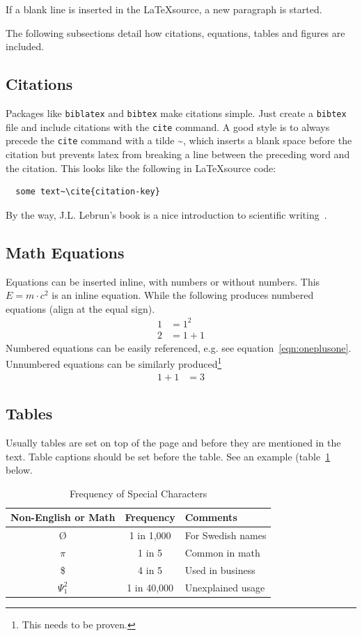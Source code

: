\documentclass[sigconf]{acmart}
\begin{document}
If a blank line is inserted in the \LaTeX source, a new paragraph is started.

The following subsections detail how citations, equations, tables and figures are included.

\subsection{Citations}
Packages like \texttt{biblatex} and \texttt{bibtex} make citations simple. Just create a \texttt{bibtex} file and include citations with the \texttt{cite} command. A good style is to always precede the \texttt{cite} command with a tilde \textasciitilde, which inserts a blank space before the citation but prevents latex from breaking a line between the preceding word and the citation. This looks like the following in \LaTeX source code:
\begin{verbatim}
  some text~\cite{citation-key}	
\end{verbatim}

By the way, J.L. Lebrun's book is a nice introduction to scientific writing~\cite{Lebrun2011}.

\subsection{Math Equations}
Equations can be inserted inline, with numbers or without numbers. This $E = m\cdot c^2$ is an inline equation. While the following produces numbered equations (align at the equal sign).
\begin{align}
\label{eqn:onesquared}
	1  &= 1^2 \\
\label{eqn:oneplusone}
	2  &= 1 +1 
\end{align}
Numbered equations can be easily referenced, e.g. see equation~\ref{eqn:oneplusone}.
Unnumbered equations can be similarly produced\footnote{This needs to be proven.}
\begin{align}
	1 +1  &= 3 
\end{align}


\subsection{Tables}
Usually tables are set on top of the page and before they are mentioned in the text. Table captions should be set before the table. See an example (table~\ref{tab:freq} below.

\begin{table}
  \caption{Frequency of Special Characters}
  \label{tab:freq}
  \begin{tabular}{ccl}
    \toprule
    Non-English or Math&Frequency&Comments\\
    \midrule
    \O & 1 in 1,000& For Swedish names\\
    $\pi$ & 1 in 5& Common in math\\
    \$ & 4 in 5 & Used in business\\
    $\Psi^2_1$ & 1 in 40,000& Unexplained usage\\
  \bottomrule
\end{tabular}
\end{table}
\end{document}
